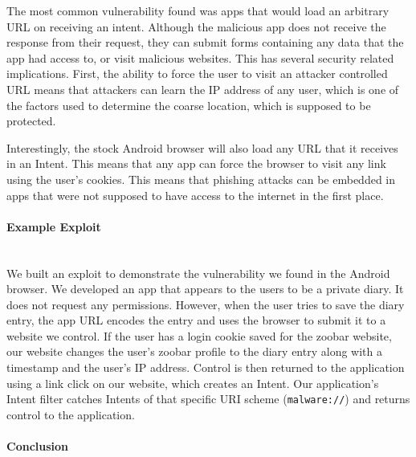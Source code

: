 \documentclass[12pt,a4paper]{article}
\begin{document}
The most common vulnerability found was apps that would load an arbitrary URL on
receiving an intent. Although the malicious app does not receive the response
from their request, they can submit forms containing any data that the app had
access to, or visit malicious websites. This has several security related
implications. First, the ability to force the user to visit an attacker
controlled URL means that attackers can learn the IP address of any user, which
is one of the factors used to determine the coarse location, which is supposed
to be protected.

Interestingly, the stock Android browser will also load any URL that it receives
in an Intent. This means that any app can force the browser to visit any link
using the user's cookies. This means that phishing attacks can be embedded in
apps that were not supposed to have access to the internet in the first place.

\paragraph{Example Exploit} ~\\

We built an exploit to demonstrate the vulnerability we found in the Android
browser. We developed an app that appears to the users to be a private diary. It
does not request any permissions. However, when the user tries to save the diary
entry, the app URL encodes the entry and uses the browser to submit it to a
website we control. If the user has a login cookie saved for the zoobar website,
our website changes the user's zoobar profile to the diary entry along with a
timestamp and the user's IP address. Control is then returned to the application
using a link click on our website, which creates an Intent. Our application's
Intent filter catches Intents of that specific URI scheme (\texttt{malware://})
and returns control to the application.

\paragraph{Conclusion} ~\\

 
\end{document}
